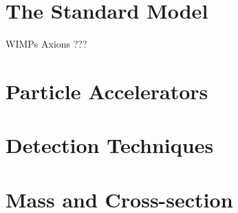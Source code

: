 
\section{The Standard Model}

WIMPs
Axions
???

\section{Particle Accelerators}


\section{Detection Techniques}


\section{Mass and Cross-section}


